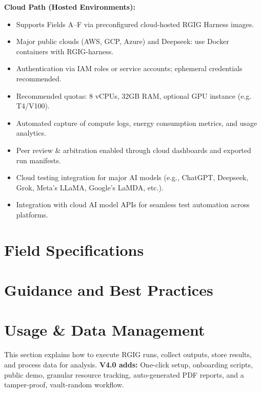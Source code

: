 \documentclass[11pt]{article}
\makeatletter
\newcommand{\inputnolabel}[1]{%
  \let\saved@label\label
  \let\label\@gobble
  \let\label\saved@label
}
\makeatother
\begin{document}
\textbf{Cloud Path (Hosted Environments):}
\begin{itemize}
  \item Supports Fields A--F via preconfigured cloud-hosted RGIG Harness images.
  \item Major public clouds (AWS, GCP, Azure) and Deepseek: use Docker containers with RGIG-harness.
  \item Authentication via IAM roles or service accounts; ephemeral credentials recommended.
  \item Recommended quotas: 8 vCPUs, 32GB RAM, optional GPU instance (e.g. T4/V100).
  \item Automated capture of compute logs, energy consumption metrics, and usage analytics.
  \item Peer review \& arbitration enabled through cloud dashboards and exported run manifests.
  \item Cloud testing integration for major AI models (e.g., ChatGPT, Deepseek, Grok, Meta's LLaMA, Google's LaMDA, etc.).
  \item Integration with cloud AI model APIs for seamless test automation across platforms.
\end{itemize}

\section*{Field Specifications}
\inputnolabel{fieldA.tex} %
\inputnolabel{fieldB.tex} %
\inputnolabel{fieldC.tex} %
\inputnolabel{fieldD.tex} %
\inputnolabel{fieldE.tex} %
\inputnolabel{fieldF.tex} %
\inputnolabel{fieldG.tex} %

\section*{Guidance and Best Practices}
\inputnolabel{guidance.tex}

\section*{Usage \& Data Management}
This section explains how to execute RGIG runs, collect outputs, store results, and process data for analysis.\newline
\textbf{V4.0 adds:} One-click setup, onboarding scripts, public demo, granular resource tracking, auto-generated PDF reports, and a tamper-proof, vault-random workflow.\\
\end{document}
